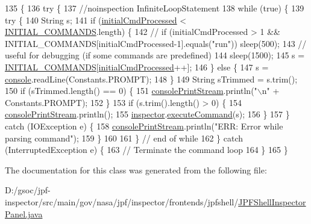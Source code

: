 \begin{DoxyCode}
135                        \{
136       \textcolor{keywordflow}{try} \{
137         \textcolor{comment}{//noinspection InfiniteLoopStatement}
138         \textcolor{keywordflow}{while} (\textcolor{keyword}{true}) \{
139           \textcolor{keywordflow}{try} \{
140             String s;
141             \textcolor{keywordflow}{if} (\hyperlink{classgov_1_1nasa_1_1jpf_1_1inspector_1_1frontends_1_1jpfshell_1_1_j_p_f_shell_inspector_panel_adb82f57985a52a65886090f3473362cd}{initialCmdProcessed} < \hyperlink{classgov_1_1nasa_1_1jpf_1_1inspector_1_1frontends_1_1jpfshell_1_1_j_p_f_shell_inspector_panel_a23cb9ba3b9b1b74057ecca791cb460ac}{INITIAL\_COMMANDS}.length) \{
142               \textcolor{comment}{// if (initialCmdProcessed > 1 && INITIAL\_COMMANDS[initialCmdProcessed-1].equals("run"))
       sleep(500);}
143               \textcolor{comment}{// useful for debugging (if some commands are predefined)}
144               sleep(1500);
145               s = \hyperlink{classgov_1_1nasa_1_1jpf_1_1inspector_1_1frontends_1_1jpfshell_1_1_j_p_f_shell_inspector_panel_a23cb9ba3b9b1b74057ecca791cb460ac}{INITIAL\_COMMANDS}[\hyperlink{classgov_1_1nasa_1_1jpf_1_1inspector_1_1frontends_1_1jpfshell_1_1_j_p_f_shell_inspector_panel_adb82f57985a52a65886090f3473362cd}{initialCmdProcessed}++];
146             \} \textcolor{keywordflow}{else} \{
147               s = \hyperlink{classgov_1_1nasa_1_1jpf_1_1inspector_1_1frontends_1_1jpfshell_1_1_j_p_f_shell_inspector_panel_a50dbdb23f406e62ef9dc75d50f72549a}{console}.readLine(Constants.PROMPT);
148             \}
149             String sTrimmed = s.trim();
150             \textcolor{keywordflow}{if} (sTrimmed.length() == 0) \{
151               \hyperlink{classgov_1_1nasa_1_1jpf_1_1inspector_1_1frontends_1_1jpfshell_1_1_j_p_f_shell_inspector_panel_a736b2f57f5e00c303d0f39b95ea20881}{consolePrintStream}.println(\textcolor{stringliteral}{"\(\backslash\)n"} + Constants.PROMPT);
152             \}
153             \textcolor{keywordflow}{if} (s.trim().length() > 0) \{
154               \hyperlink{classgov_1_1nasa_1_1jpf_1_1inspector_1_1frontends_1_1jpfshell_1_1_j_p_f_shell_inspector_panel_a736b2f57f5e00c303d0f39b95ea20881}{consolePrintStream}.println();
155               \hyperlink{classgov_1_1nasa_1_1jpf_1_1inspector_1_1frontends_1_1jpfshell_1_1_j_p_f_shell_inspector_panel_acecd6528a364612136bc7cf50bd89e69}{inspector}.\hyperlink{interfacegov_1_1nasa_1_1jpf_1_1inspector_1_1client_1_1_j_p_f_inspector_client_interface_a311b9271afa61a535f0dbccd80fdf4f5}{executeCommand}(s);
156             \}
157           \} \textcolor{keywordflow}{catch} (IOException e) \{
158             \hyperlink{classgov_1_1nasa_1_1jpf_1_1inspector_1_1frontends_1_1jpfshell_1_1_j_p_f_shell_inspector_panel_a736b2f57f5e00c303d0f39b95ea20881}{consolePrintStream}.println(\textcolor{stringliteral}{"ERR: Error while parsing command"});
159           \}
160 
161         \} \textcolor{comment}{// end of while}
162       \} \textcolor{keywordflow}{catch} (InterruptedException e) \{
163         \textcolor{comment}{// Terminate the command loop}
164       \}
165     \}
\end{DoxyCode}


The documentation for this class was generated from the following file\+:\begin{DoxyCompactItemize}
\item 
D\+:/gsoc/jpf-\/inspector/src/main/gov/nasa/jpf/inspector/frontends/jpfshell/\hyperlink{_j_p_f_shell_inspector_panel_8java}{J\+P\+F\+Shell\+Inspector\+Panel.\+java}\end{DoxyCompactItemize}

